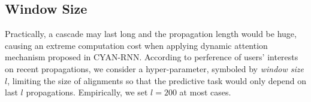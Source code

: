 \subsection{Window Size}
Practically, a cascade may last long and the propagation length would be huge,
causing an extreme computation cost when applying dynamic attention mechanism
proposed in CYAN-RNN. According to perference of users' interests on recent
propagations, we consider a hyper-parameter, symboled by \emph{window size}
$l$, limiting the size of alignments so that the predictive task would only
depend on last $l$ propagations. Empirically, we set $l=200$ at most cases.

